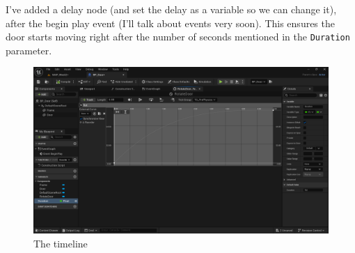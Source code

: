 \documentclass[]{article}
\begin{document}
	I've added a delay node (and set the delay as a variable so we can change it), after the begin play event (I'll talk about events very soon). This ensures the door starts moving right after the number of seconds mentioned in the \verb*|Duration| parameter.
	
	\newpage
	
	\begin{figure}[h]
		\centering
		\includegraphics[width=1\linewidth]{week2part2/screenshot002}
		\caption{The timeline}
		\label{fig:screenshot002}
	\end{figure}
	
\end{document}
